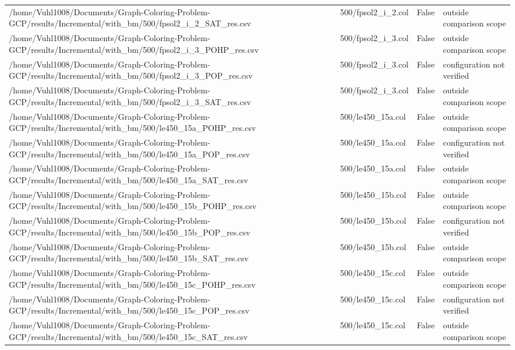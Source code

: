 \begin{table}[htbp]
\begin{tabular}{llll}
/home/Vuhl1008/Documents/Graph-Coloring-Problem-GCP/results/Incremental/with\_bm/500/fpsol2\_i\_2\_SAT\_res.csv & 500/fpsol2\_i\_2.col & False & outside comparison scope \\
/home/Vuhl1008/Documents/Graph-Coloring-Problem-GCP/results/Incremental/with\_bm/500/fpsol2\_i\_3\_POHP\_res.csv & 500/fpsol2\_i\_3.col & False & outside comparison scope \\
/home/Vuhl1008/Documents/Graph-Coloring-Problem-GCP/results/Incremental/with\_bm/500/fpsol2\_i\_3\_POP\_res.csv & 500/fpsol2\_i\_3.col & False & configuration not verified \\
/home/Vuhl1008/Documents/Graph-Coloring-Problem-GCP/results/Incremental/with\_bm/500/fpsol2\_i\_3\_SAT\_res.csv & 500/fpsol2\_i\_3.col & False & outside comparison scope \\
/home/Vuhl1008/Documents/Graph-Coloring-Problem-GCP/results/Incremental/with\_bm/500/le450\_15a\_POHP\_res.csv & 500/le450\_15a.col & False & outside comparison scope \\
/home/Vuhl1008/Documents/Graph-Coloring-Problem-GCP/results/Incremental/with\_bm/500/le450\_15a\_POP\_res.csv & 500/le450\_15a.col & False & configuration not verified \\
/home/Vuhl1008/Documents/Graph-Coloring-Problem-GCP/results/Incremental/with\_bm/500/le450\_15a\_SAT\_res.csv & 500/le450\_15a.col & False & outside comparison scope \\
/home/Vuhl1008/Documents/Graph-Coloring-Problem-GCP/results/Incremental/with\_bm/500/le450\_15b\_POHP\_res.csv & 500/le450\_15b.col & False & outside comparison scope \\
/home/Vuhl1008/Documents/Graph-Coloring-Problem-GCP/results/Incremental/with\_bm/500/le450\_15b\_POP\_res.csv & 500/le450\_15b.col & False & configuration not verified \\
/home/Vuhl1008/Documents/Graph-Coloring-Problem-GCP/results/Incremental/with\_bm/500/le450\_15b\_SAT\_res.csv & 500/le450\_15b.col & False & outside comparison scope \\
/home/Vuhl1008/Documents/Graph-Coloring-Problem-GCP/results/Incremental/with\_bm/500/le450\_15c\_POHP\_res.csv & 500/le450\_15c.col & False & outside comparison scope \\
/home/Vuhl1008/Documents/Graph-Coloring-Problem-GCP/results/Incremental/with\_bm/500/le450\_15c\_POP\_res.csv & 500/le450\_15c.col & False & configuration not verified \\
/home/Vuhl1008/Documents/Graph-Coloring-Problem-GCP/results/Incremental/with\_bm/500/le450\_15c\_SAT\_res.csv & 500/le450\_15c.col & False & outside comparison scope \\

\end{tabular}
\end{table}
